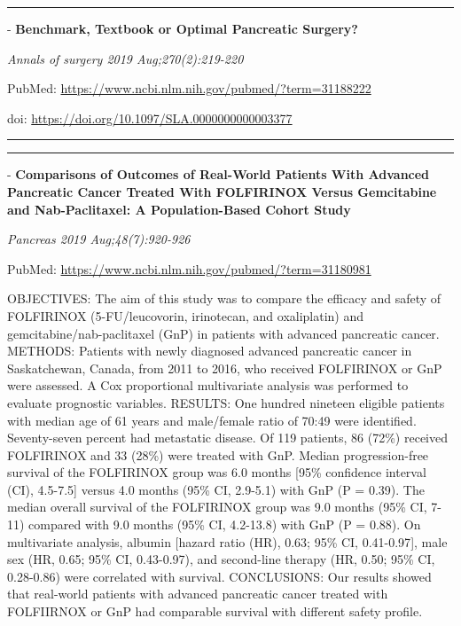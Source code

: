 \documentclass[]{article}
\begin{document}
\begin{center}\rule{0.5\linewidth}{\linethickness}\end{center}

 - \textbf{Benchmark, Textbook or Optimal Pancreatic Surgery?}

\emph{Annals of surgery 2019 Aug;270(2):219-220}

PubMed: \url{https://www.ncbi.nlm.nih.gov/pubmed/?term=31188222}

doi: \url{https://doi.org/10.1097/SLA.0000000000003377}

{}

{}

\begin{center}\rule{0.5\linewidth}{\linethickness}\end{center}

\begin{center}\rule{0.5\linewidth}{\linethickness}\end{center}

 - \textbf{Comparisons of Outcomes of Real-World Patients With Advanced
Pancreatic Cancer Treated With FOLFIRINOX Versus Gemcitabine and
Nab-Paclitaxel: A Population-Based Cohort Study}

\emph{Pancreas 2019 Aug;48(7):920-926}

PubMed: \url{https://www.ncbi.nlm.nih.gov/pubmed/?term=31180981}

OBJECTIVES: The aim of this study was to compare the efficacy and safety
of FOLFIRINOX (5-FU/leucovorin, irinotecan, and oxaliplatin) and
gemcitabine/nab-paclitaxel (GnP) in patients with advanced pancreatic
cancer. METHODS: Patients with newly diagnosed advanced pancreatic
cancer in Saskatchewan, Canada, from 2011 to 2016, who received
FOLFIRINOX or GnP were assessed. A Cox proportional multivariate
analysis was performed to evaluate prognostic variables. RESULTS: One
hundred nineteen eligible patients with median age of 61 years and
male/female ratio of 70:49 were identified. Seventy-seven percent had
metastatic disease. Of 119 patients, 86 (72\%) received FOLFIRINOX and
33 (28\%) were treated with GnP. Median progression-free survival of the
FOLFIRINOX group was 6.0 months {[}95\% confidence interval (CI),
4.5-7.5{]} versus 4.0 months (95\% CI, 2.9-5.1) with GnP (P = 0.39). The
median overall survival of the FOLFIRINOX group was 9.0 months (95\% CI,
7-11) compared with 9.0 months (95\% CI, 4.2-13.8) with GnP (P = 0.88).
On multivariate analysis, albumin {[}hazard ratio (HR), 0.63; 95\% CI,
0.41-0.97{]}, male sex (HR, 0.65; 95\% CI, 0.43-0.97), and second-line
therapy (HR, 0.50; 95\% CI, 0.28-0.86) were correlated with survival.
CONCLUSIONS: Our results showed that real-world patients with advanced
pancreatic cancer treated with FOLFIIRNOX or GnP had comparable survival
with different safety profile.
\end{document}
